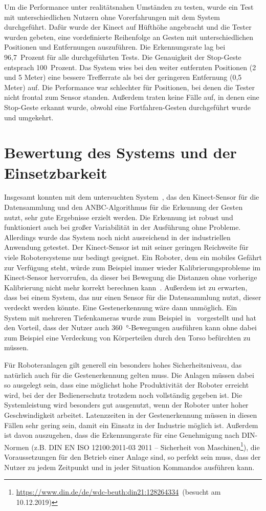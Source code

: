 Um die Performance unter realitätsnahen Umständen zu testen, wurde ein Test mit unterschiedlichen Nutzern ohne Vorerfahrungen mit dem System durchgeführt. Dafür wurde der Kinect auf Hüfthöhe angebracht und die Tester wurden gebeten, eine vordefinierte Reihenfolge an Gesten mit unterschiedlichen Positionen und Entfernungen auszuführen. Die Erkennungsrate lag bei 96,7~Prozent für alle durchgeführten Tests. Die Genauigkeit der Stop-Geste entsprach 100~Prozent. Das System wies bei den weiter entfernten Positionen (2 und 5 Meter) eine bessere Trefferrate als bei der geringeren Entfernung (0,5 Meter) auf. Die Performance war schlechter für Positionen, bei denen die Tester nicht frontal zum Sensor standen. Außerdem traten keine Fälle auf, in denen eine Stop-Geste erkannt wurde, obwohl eine Fortfahren-Gesten durchgeführt wurde und umgekehrt.~\cite{flexibleSystem}

\section{Bewertung des Systems und der Einsetzbarkeit}
Insgesamt konnten mit dem untersuchten System~\cite{flexibleSystem}, das den Kinect-Sensor für die Datensammlung und den ANBC-Algorithmus für die Erkennung der Gesten nutzt, sehr gute Ergebnisse erzielt werden. Die Erkennung ist robust und funktioniert auch bei großer Variabilität in der Ausführung ohne Probleme. Allerdings wurde das System noch nicht ausreichend in der industriellen Anwendung getestet. Der Kinect-Sensor ist mit seiner geringen Reichweite für viele Robotersysteme nur bedingt geeignet. Ein Roboter, dem ein mobiles Gefährt zur Verfügung steht, würde zum Beispiel immer wieder Kalibrierungsprobleme im Kinect-Sensor hervorrufen, da dieser bei Bewegung die Distanzen ohne vorherige Kalibrierung nicht mehr korrekt berechnen kann~\cite{cruzkinect}. Außerdem ist zu erwarten, dass bei einem System, das nur einen Sensor für die Datensammlung nutzt, dieser verdeckt werden könnte. Eine Gestenerkennung wäre dann unmöglich. Ein System mit mehreren Tiefenkameras wurde zum Beispiel in~\cite{multipleDepthCameras} vorgestellt und hat den Vorteil, dass der Nutzer auch \SI{360}{\degree}-Bewegungen ausführen kann ohne dabei zum Beispiel eine Verdeckung von Körperteilen durch den Torso befürchten zu müssen.

Für Roboteranlagen gilt generell ein besonders hohes Sicherheitsniveau, das natürlich auch für die Gestenerkennung gelten muss. Die Anlagen müssen dabei so ausgelegt sein, dass eine möglichst hohe Produktivität der Roboter erreicht wird, bei der der Bedienerschutz trotzdem noch vollständig gegeben ist. Die Systemleistung wird besonders gut ausgenutzt, wenn der Roboter unter hoher Geschwindigkeit arbeitet. Latenzzeiten in der Gestenerkennung müssen in diesen Fällen sehr gering sein, damit ein Einsatz in der Industrie möglich ist. Außerdem ist davon auszugehen, dass die Erkennungsrate für eine Genehmigung nach DIN-Normen (z.B. DIN EN ISO 12100:2011-03 2011 -- Sicherheit von Maschinen\footnote{\url{https://www.din.de/de/wdc-beuth:din21:128264334}~(besucht am 10.12.2019)}), die Voraussetzungen für den Betrieb einer Anlage sind, so perfekt sein muss, dass der Nutzer zu jedem Zeitpunkt und in jeder Situation Kommandos ausführen kann.~\cite{ObererTreitz.2019}

